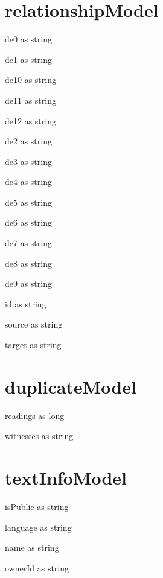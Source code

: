 \section{relationshipModel}
\begin{property}
de0 as string
\end{property}
\begin{property}
de1 as string
\end{property}
\begin{property}
de10 as string
\end{property}
\begin{property}
de11 as string
\end{property}
\begin{property}
de12 as string
\end{property}
\begin{property}
de2 as string
\end{property}
\begin{property}
de3 as string
\end{property}
\begin{property}
de4 as string
\end{property}
\begin{property}
de5 as string
\end{property}
\begin{property}
de6 as string
\end{property}
\begin{property}
de7 as string
\end{property}
\begin{property}
de8 as string
\end{property}
\begin{property}
de9 as string
\end{property}
\begin{property}
id as string
\end{property}
\begin{property}
source as string
\end{property}
\begin{property}
target as string
\end{property}
\section{duplicateModel}
\begin{property}
readings as long
\end{property}
\begin{property}
witnesses as string
\end{property}
\section{textInfoModel}
\begin{property}
isPublic as string
\end{property}
\begin{property}
language as string
\end{property}
\begin{property}
name as string
\end{property}
\begin{property}
ownerId as string
\end{property}
